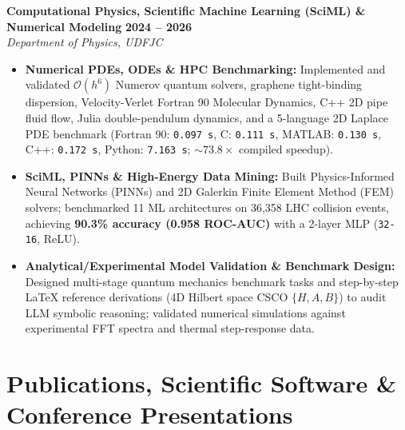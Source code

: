 \documentclass[10pt,a4paper]{article}
\begin{document}
\vspace{3pt}
\textbf{Computational Physics, Scientific Machine Learning (SciML) \& Numerical Modeling} \hfill \textbf{2024 -- 2026}\\
\textit{Department of Physics, UDFJC}
\begin{itemize}
  \item \textbf{Numerical PDEs, ODEs \& HPC Benchmarking:} Implemented and validated $\mathcal{O}(h^6)$ Numerov quantum solvers, graphene tight-binding dispersion, Velocity-Verlet Fortran 90 Molecular Dynamics, C++ 2D pipe fluid flow, Julia double-pendulum dynamics, and a 5-language 2D Laplace PDE benchmark (Fortran 90: \texttt{0.097 s}, C: \texttt{0.111 s}, MATLAB: \texttt{0.130 s}, C++: \texttt{0.172 s}, Python: \texttt{7.163 s}; $\sim 73.8\times$ compiled speedup).
  \item \textbf{SciML, PINNs \& High-Energy Data Mining:} Built Physics-Informed Neural Networks (PINNs) and 2D Galerkin Finite Element Method (FEM) solvers; benchmarked 11 ML architectures on 36,358 LHC collision events, achieving \textbf{90.3\% accuracy (0.958 ROC-AUC)} with a 2-layer MLP (\texttt{32-16}, ReLU).
  \item \textbf{Analytical/Experimental Model Validation \& Benchmark Design:} Designed multi-stage quantum mechanics benchmark tasks and step-by-step \LaTeX{} reference derivations (4D Hilbert space CSCO $\{H,A,B\}$) to audit LLM symbolic reasoning; validated numerical simulations against experimental FFT spectra and thermal step-response data.
\end{itemize}

\section{Publications, Scientific Software \& Conference Presentations}
\end{document}
